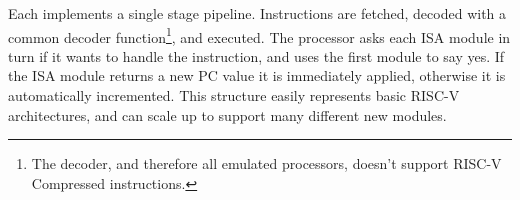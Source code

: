 Each  implements a single stage pipeline.
Instructions are fetched, decoded with a common decoder function\footnote{The decoder, and therefore all emulated processors, doesn't support RISC-V Compressed instructions.}, and executed.
The processor asks each ISA module in turn if it wants to handle the instruction, and uses the first module to say yes.
If the ISA module returns a new PC value it is immediately applied, otherwise it is automatically incremented.
This structure easily represents basic RISC-V architectures, and can scale up to support many different new modules.








